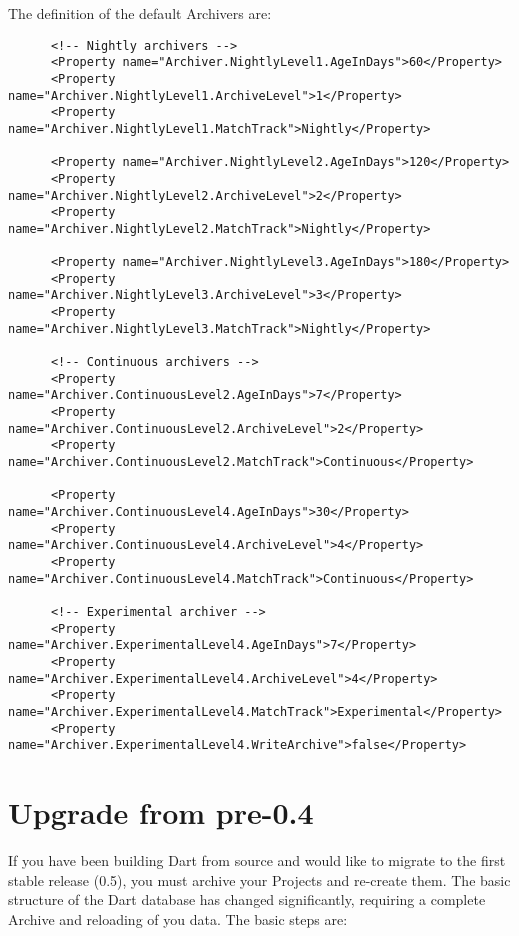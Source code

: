 \documentclass{InsightBook}
\begin{document}
The definition of the default Archivers are:
\begin{verbatim}
      <!-- Nightly archivers -->
      <Property name="Archiver.NightlyLevel1.AgeInDays">60</Property>
      <Property name="Archiver.NightlyLevel1.ArchiveLevel">1</Property>
      <Property name="Archiver.NightlyLevel1.MatchTrack">Nightly</Property>

      <Property name="Archiver.NightlyLevel2.AgeInDays">120</Property>
      <Property name="Archiver.NightlyLevel2.ArchiveLevel">2</Property>
      <Property name="Archiver.NightlyLevel2.MatchTrack">Nightly</Property>
      
      <Property name="Archiver.NightlyLevel3.AgeInDays">180</Property>
      <Property name="Archiver.NightlyLevel3.ArchiveLevel">3</Property>
      <Property name="Archiver.NightlyLevel3.MatchTrack">Nightly</Property>

      <!-- Continuous archivers -->
      <Property name="Archiver.ContinuousLevel2.AgeInDays">7</Property>
      <Property name="Archiver.ContinuousLevel2.ArchiveLevel">2</Property>
      <Property name="Archiver.ContinuousLevel2.MatchTrack">Continuous</Property>
      
      <Property name="Archiver.ContinuousLevel4.AgeInDays">30</Property>
      <Property name="Archiver.ContinuousLevel4.ArchiveLevel">4</Property>
      <Property name="Archiver.ContinuousLevel4.MatchTrack">Continuous</Property>

      <!-- Experimental archiver -->      
      <Property name="Archiver.ExperimentalLevel4.AgeInDays">7</Property>
      <Property name="Archiver.ExperimentalLevel4.ArchiveLevel">4</Property>
      <Property name="Archiver.ExperimentalLevel4.MatchTrack">Experimental</Property>
      <Property name="Archiver.ExperimentalLevel4.WriteArchive">false</Property>

\end{verbatim}

\section{Upgrade from pre-0.4}
\label{Section:Upgrade}
If you have been building Dart from source and would like to migrate
to the first stable release (0.5), you must archive your Projects and
re-create them.  The basic structure of the Dart database has changed
significantly, requiring a complete Archive and reloading of you
data.  The basic steps are:
\end{document}
